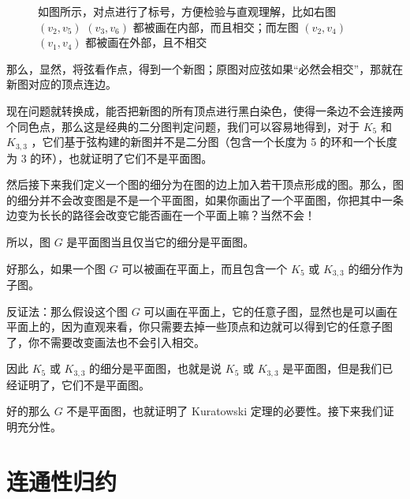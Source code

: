 \documentclass[11pt, a4paper]{ctexart}
\begin{document}
\begin{figure}[H]
    \caption{如图所示，对点进行了标号，方便检验与直观理解，比如右图 $(v_2,v_5)$ $(v_3,v_6)$ 都被画在内部，而且相交；而左图 $(v_2,v_4)$ $(v_1,v_4)$ 都被画在外部，且不相交}
\end{figure}

那么，显然，将弦看作点，得到一个新图；原图对应弦如果“必然会相交”，那就在新图对应的顶点连边。

现在问题就转换成，能否把新图的所有顶点进行黑白染色，使得一条边不会连接两个同色点，那么这是经典的二分图判定问题，我们可以容易地得到，对于 $K_5$ 和 $K_{3,3}$ ，它们基于弦构建的新图并不是二分图（包含一个长度为 5 的环和一个长度为 3 的环），也就证明了它们不是平面图。

然后接下来我们定义一个图的细分为在图的边上加入若干顶点形成的图。那么，图的细分并不会改变图是不是一个平面图，如果你画出了一个平面图，你把其中一条边变为长长的路径会改变它能否画在一个平面上嘛？当然不会！

所以，图 $G$ 是平面图当且仅当它的细分是平面图。

好那么，如果一个图 $G$ 可以被画在平面上，而且包含一个 $K_5$ 或 $K_{3,3}$ 的细分作为子图。

反证法：那么假设这个图 $G$ 可以画在平面上，它的任意子图，显然也是可以画在平面上的，因为直观来看，你只需要去掉一些顶点和边就可以得到它的任意子图了，你不需要改变画法也不会引入相交。

因此 $K_5$ 或 $K_{3,3}$ 的细分是平面图，也就是说 $K_5$ 或 $K_{3,3}$ 是平面图，但是我们已经证明了，它们不是平面图。

好的那么 $G$ 不是平面图，也就证明了 Kuratowski 定理的必要性。接下来我们证明充分性。

\section{连通性归约}
\end{document}
